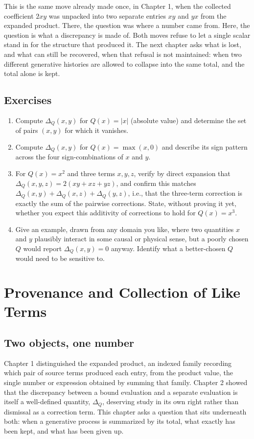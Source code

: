 \documentclass[11pt]{book}
\begin{document}
This is the same move already made once, in Chapter 1, when the collected coefficient $2xy$ was unpacked into two separate entries $xy$ and $yx$ from the expanded product. There, the question was where a number came from. Here, the question is what a discrepancy is made of. Both moves refuse to let a single scalar stand in for the structure that produced it. The next chapter asks what is lost, and what can still be recovered, when that refusal is not maintained: when two different generative histories are allowed to collapse into the same total, and the total alone is kept.

\section*{Exercises}
\begin{enumerate}
\item Compute $\Delta_Q(x,y)$ for $Q(x) = |x|$ (absolute value) and determine the set of pairs $(x,y)$ for which it vanishes.
\item Compute $\Delta_Q(x,y)$ for $Q(x) = \max(x,0)$ and describe its sign pattern across the four sign-combinations of $x$ and $y$.
\item For $Q(x)=x^2$ and three terms $x,y,z$, verify by direct expansion that $\Delta_Q(x,y,z) = 2(xy+xz+yz)$, and confirm this matches $\Delta_Q(x,y)+\Delta_Q(x,z)+\Delta_Q(y,z)$, i.e., that the three-term correction is exactly the sum of the pairwise corrections. State, without proving it yet, whether you expect this additivity of corrections to hold for $Q(x)=x^3$.
\item Give an example, drawn from any domain you like, where two quantities $x$ and $y$ plausibly interact in some causal or physical sense, but a poorly chosen $Q$ would report $\Delta_Q(x,y)=0$ anyway. Identify what a better-chosen $Q$ would need to be sensitive to.
\end{enumerate}

\chapter{Provenance and Collection of Like Terms}

\section{Two objects, one number}

Chapter 1 distinguished the expanded product, an indexed family recording which pair of source terms produced each entry, from the product value, the single number or expression obtained by summing that family. Chapter 2 showed that the discrepancy between a bound evaluation and a separate evaluation is itself a well-defined quantity, $\Delta_Q$, deserving study in its own right rather than dismissal as a correction term. This chapter asks a question that sits underneath both: when a generative process is summarized by its total, what exactly has been kept, and what has been given up.
\end{document}
